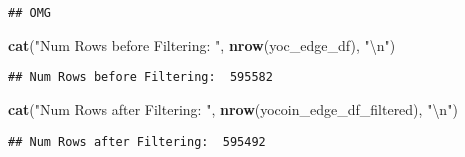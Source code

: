 \documentclass[]{article}
\newenvironment{Shaded}{\begin{snugshade}}{\end{snugshade}}
\newcommand{\KeywordTok}[1]{\textcolor[rgb]{0.13,0.29,0.53}{\textbf{#1}}}
\newcommand{\DecValTok}[1]{\textcolor[rgb]{0.00,0.00,0.81}{#1}}
\newcommand{\CharTok}[1]{\textcolor[rgb]{0.31,0.60,0.02}{#1}}
\newcommand{\StringTok}[1]{\textcolor[rgb]{0.31,0.60,0.02}{#1}}
\newcommand{\OperatorTok}[1]{\textcolor[rgb]{0.81,0.36,0.00}{\textbf{#1}}}
\newcommand{\NormalTok}[1]{#1}
\begin{document}
\begin{Shaded}
\end{Shaded}

\begin{verbatim}
## OMG
\end{verbatim}

\begin{Shaded}
\begin{Highlighting}[]
\KeywordTok{cat}\NormalTok{(}\StringTok{"Num Rows before Filtering: "}\NormalTok{, }\KeywordTok{nrow}\NormalTok{(yoc_edge_df), }\StringTok{"}\CharTok{\textbackslash{}n}\StringTok{"}\NormalTok{)}
\end{Highlighting}
\end{Shaded}

\begin{verbatim}
## Num Rows before Filtering:  595582
\end{verbatim}

\begin{Shaded}
\begin{Highlighting}[]
\KeywordTok{cat}\NormalTok{(}\StringTok{"Num Rows after Filtering: "}\NormalTok{, }\KeywordTok{nrow}\NormalTok{(yocoin_edge_df_filtered), }\StringTok{"}\CharTok{\textbackslash{}n}\StringTok{"}\NormalTok{)}
\end{Highlighting}
\end{Shaded}

\begin{verbatim}
## Num Rows after Filtering:  595492
\end{verbatim}
\end{document}
